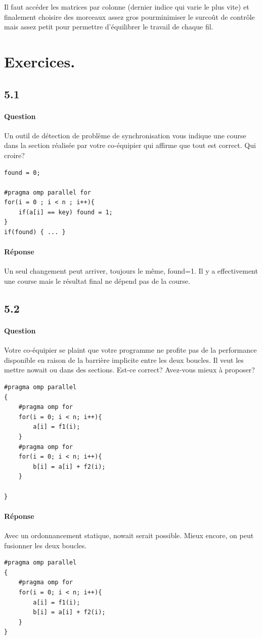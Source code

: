 \documentclass[oneside]{book}
\begin{document}
Il faut accéder les matrices par colonne (dernier indice qui varie le plus vite) et finalement choisire des morceaux assez gros pourminimiser le surcoût de contrôle mais assez petit pour permettre d'équilibrer le travail de chaque fil.

\section{Exercices.}
\subsection{5.1}
\paragraph{Question}
Un outil de détection de problème de synchronisation vous indique une course
dans la section réalisée par votre co-équipier qui affirme que tout est correct. Qui
croire?
\begin{lstlisting}
found = 0;

#pragma omp parallel for
for(i = 0 ; i < n ; i++){ 
	if(a[i] == key) found = 1; 
}
if(found) { ... }

\end{lstlisting}
\paragraph{Réponse}
Un seul changement peut arriver, toujours le même, found=1. Il y a effectivement
une course mais le résultat final ne dépend pas de la course.

\subsection{5.2}
\paragraph{Question}
Votre co-équipier se plaint que votre programme ne profite pas de la performance
disponible en raison de la barrière implicite entre les deux boucles. Il veut les
mettre nowait ou dans des sections. Est-ce correct? Avez-vous mieux à proposer?
\begin{lstlisting}
#pragma omp parallel
{ 
	#pragma omp for
	for(i = 0; i < n; i++){ 
		a[i] = f1(i); 
	}
	#pragma omp for
	for(i = 0; i < n; i++){ 
		b[i] = a[i] + f2(i); 
	}

}
\end{lstlisting}
\paragraph{Réponse}
Avec un ordonnancement statique, nowait serait possible. Mieux encore, on peut
fusionner les deux boucles.
\begin{lstlisting}
#pragma omp parallel
{ 
	#pragma omp for
	for(i = 0; i < n; i++){ 
		a[i] = f1(i);
		b[i] = a[i] + f2(i);
	}
}
\end{lstlisting}
\end{document}
